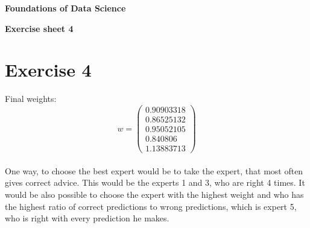 \documentclass[a4paper,10pt]{article}
\begin{document}
\centerline{\Large\bfseries  Foundations of Data Science }
\centerline{\bfseries  Exercise sheet 4}


\section*{Exercise 4}
Final weights:
\[w= \begin{pmatrix}
0.90903318\\  0.86525132 \\  0.95052105 \\ 0.840806 \\    1.13883713
\end{pmatrix} \]
\\
One way, to choose the best expert would be to take the expert, that most often gives correct advice. This would be the experts 1 and 3, who are right 4 times. It would be also possible to choose the expert with the highest weight and who has the highest ratio of correct predictions to wrong predictions, which is expert 5, who is right with every prediction he makes.
\end{document}
